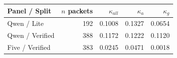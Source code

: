 \begin{tabular}{lrrrr}
\toprule
Panel / Split & $n$ packets & $\kappa_{all}$ & $\kappa_a$ & $\kappa_g$ \\
\midrule
Qwen / Lite & 192 & 0.1008 & 0.1327 & 0.0654 \\
Qwen / Verified & 388 & 0.1172 & 0.1222 & 0.1120 \\
Five / Verified & 383 & 0.0245 & 0.0471 & 0.0018 \\
\bottomrule
\end{tabular}
